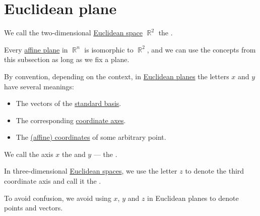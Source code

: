 \section{Euclidean plane}\label{sec:euclidean_plane}

\begin{definition}\label{def:euclidean_plane}
  We call the two-dimensional \hyperref[def:euclidean_space]{Euclidean space} \( \BbbR^2 \) the .
\end{definition}

\begin{remark}\label{rem:euclidean_plane_embedding}
  Every \hyperref[def:affine_plane]{affine plane} in \( \BbbR^n \) is isomorphic to \( \BbbR^2 \), and we can use the concepts from this subsection as long as we fix a plane.
\end{remark}

\begin{remark}\label{rem:xyz}
  By convention, depending on the context, in \hyperref[def:euclidean_plane]{Euclidean planes} the letters \( x \) and \( y \) have several meanings:
  \begin{itemize}
    \item The vectors of the \hyperref[def:coordinate_space]{standard basis}.
    \item The corresponding \hyperref[def:euclidean_plane]{coordinate axes}.
    \item The \hyperref[def:affine_coordinate_system]{(affine) coordinates} of some arbitrary point.
  \end{itemize}

  We call the axis \( x \) the  and \( y \) --- the .

  In three-dimensional \hyperref[def:euclidean_space]{Euclidean spaces}, we use the letter \( z \) to denote the third coordinate axis and call it the .

  To avoid confusion, we avoid using \( x \), \( y \) and \( z \) in Euclidean planes to denote points and vectors.
\end{remark}

